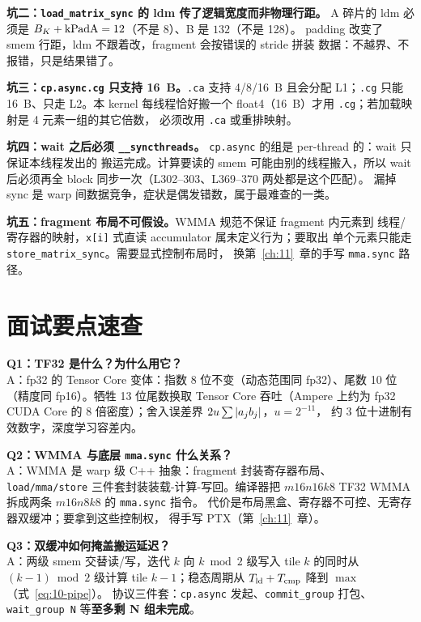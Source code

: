 \textbf{坑二：\texttt{load\_\allowbreak{}matrix\_\allowbreak{}sync} 的 ldm 传了逻辑宽度而非物理行距。}
A 碎片的 ldm 必须是 $B\sb K+\mathrm{kPadA}=12$（不是 8）、B 是 $132$（不是 128）。
padding 改变了 smem 行距，ldm 不跟着改，fragment 会按错误的 stride 拼装
数据：不越界、不报错，只是结果错了。

\textbf{坑三：\texttt{cp.async.cg} 只支持 16~B。}\texttt{.ca} 支持 4/8/16~B
且会分配 L1；\texttt{.cg} 只能 16~B、只走 L2。本 kernel 每线程恰好搬一个
float4（16~B）才用 \texttt{.cg}；若加载映射是 4 元素一组的其它倍数，
必须改用 \texttt{.ca} 或重排映射。

\textbf{坑四：wait 之后必须 \texttt{\_\allowbreak{}\_\allowbreak{}syncthreads}。}
\texttt{cp.async} 的组是 per-thread 的：wait 只保证本线程发出的
搬运完成。计算要读的 smem 可能由别的线程搬入，所以
wait 后必须再全 block 同步一次（L302--303、L369--370 两处都是这个匹配）。
漏掉 sync 是 warp 间数据竞争，症状是偶发错数，属于最难查的一类。

\textbf{坑五：fragment 布局不可假设。}\allowbreak{}WMMA 规范不保证 fragment 内元素到
线程/寄存器的映射，\texttt{x[i]} 式直读 accumulator 属未定义行为；要取出
单个元素只能走 \texttt{store\_\allowbreak{}matrix\_\allowbreak{}sync}。需要显式控制布局时，
换第~\ref{ch:11}~章的手写 \texttt{mma.sync} 路径。

\section{面试要点速查}

\textbf{Q1：TF32 是什么？为什么用它？}\\
A：fp32 的 Tensor Core 变体：指数 8 位不变（动态范围同 fp32）、尾数 10 位
（精度同 fp16）。牺牲 13 位尾数换取 Tensor Core 吞吐（Ampere 上约为 fp32
CUDA Core 的 8 倍密度）；舍入误差界 $2u\sum|a\sb jb\sb j|$，$u = 2^{-11}$，
约 3 位十进制有效数字，深度学习容差内。

\textbf{Q2：WMMA 与底层 \texttt{mma.sync} 什么关系？}\\
A：WMMA 是 warp 级 C++ 抽象：fragment 封装寄存器布局、
\texttt{load/\allowbreak{}mma/\allowbreak{}store} 三件套封装装载-计算-写回。编译器把
$m16n16k8$ TF32 WMMA 拆成两条 $m16n8k8$ 的 \texttt{mma.sync} 指令。
代价是布局黑盒、寄存器不可控、无寄存器双缓冲；要拿到这些控制权，
得手写 PTX（第~\ref{ch:11}~章）。

\textbf{Q3：双缓冲如何掩盖搬运延迟？}\\
A：两级 smem 交替读/写，迭代 $k$ 向 $k\bmod2$ 级写入 tile $k$ 的同时从
$(k{-}1)\bmod2$ 级计算 tile $k{-}1$；稳态周期从
$T\sb {\mathrm{ld}}+T\sb {\mathrm{cmp}}$ 降到 $\max$（式~\ref{eq:10-pipe}）。
协议三件套：\texttt{cp.async} 发起、\texttt{commit\_\allowbreak{}group} 打包、
\texttt{wait\_group N} 等\textbf{至多剩 N 组未完成}。

